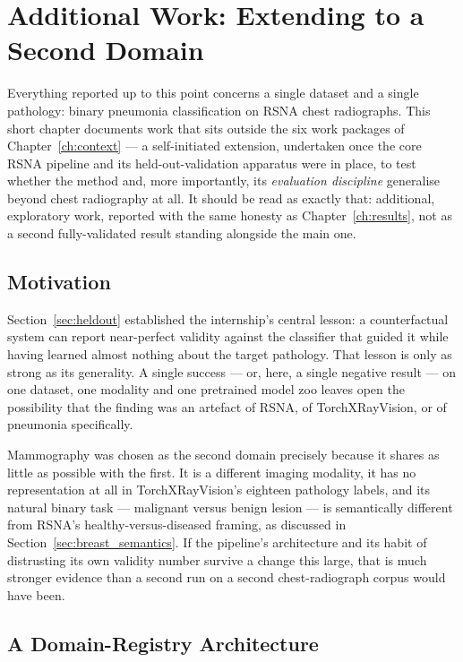 \chapter{Additional Work: Extending to a Second Domain}
\label{ch:breast}

Everything reported up to this point concerns a single dataset and a single
pathology: binary pneumonia classification on RSNA chest radiographs. This
short chapter documents work that sits outside the six work packages of
Chapter~\ref{ch:context} --- a self-initiated extension, undertaken once the
core RSNA pipeline and its held-out-validation apparatus were in place, to
test whether the method and, more importantly, its \emph{evaluation
discipline} generalise beyond chest radiography at all. It should be read as
exactly that: additional, exploratory work, reported with the same honesty
as Chapter~\ref{ch:results}, not as a second fully-validated result standing
alongside the main one.

\section{Motivation}

Section~\ref{sec:heldout} established the internship's central lesson: a
counterfactual system can report near-perfect validity against the
classifier that guided it while having learned almost nothing about the
target pathology. That lesson is only as strong as its generality. A single
success --- or, here, a single negative result --- on one dataset, one
modality and one pretrained model zoo leaves open the possibility that the
finding was an artefact of RSNA, of TorchXRayVision, or of pneumonia
specifically.

Mammography was chosen as the second domain precisely because it shares as
little as possible with the first. It is a different imaging modality, it
has no representation at all in TorchXRayVision's eighteen pathology
labels, and its natural binary task --- malignant versus benign lesion ---
is semantically different from RSNA's healthy-versus-diseased framing, as
discussed in Section~\ref{sec:breast_semantics}. If the pipeline's
architecture and its habit of distrusting its own validity number survive a
change this large, that is much stronger evidence than a second run on a
second chest-radiograph corpus would have been.

\section{A Domain-Registry Architecture}

